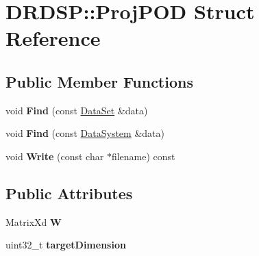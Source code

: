 \hypertarget{struct_d_r_d_s_p_1_1_proj_p_o_d}{\section{D\-R\-D\-S\-P\-:\-:Proj\-P\-O\-D Struct Reference}
\label{struct_d_r_d_s_p_1_1_proj_p_o_d}
}
\subsection*{Public Member Functions}
\begin{DoxyCompactItemize}
\item 
\hypertarget{struct_d_r_d_s_p_1_1_proj_p_o_d_ac9f95c6bc8a50ef1c714e32712449073}{void {\bfseries Find} (const \hyperlink{struct_d_r_d_s_p_1_1_data_set}{Data\-Set} \&data)}\label{struct_d_r_d_s_p_1_1_proj_p_o_d_ac9f95c6bc8a50ef1c714e32712449073}

\item 
\hypertarget{struct_d_r_d_s_p_1_1_proj_p_o_d_a47ceedabfdb2198401808fda62c4fe35}{void {\bfseries Find} (const \hyperlink{struct_d_r_d_s_p_1_1_data_system}{Data\-System} \&data)}\label{struct_d_r_d_s_p_1_1_proj_p_o_d_a47ceedabfdb2198401808fda62c4fe35}

\item 
\hypertarget{struct_d_r_d_s_p_1_1_proj_p_o_d_a78b437529229440941c60b44cee5144a}{void {\bfseries Write} (const char $\ast$filename) const }\label{struct_d_r_d_s_p_1_1_proj_p_o_d_a78b437529229440941c60b44cee5144a}

\end{DoxyCompactItemize}
\subsection*{Public Attributes}
\begin{DoxyCompactItemize}
\item 
\hypertarget{struct_d_r_d_s_p_1_1_proj_p_o_d_accfcb1fe9ae69a35a85d74732a04c9c7}{Matrix\-Xd {\bfseries W}}\label{struct_d_r_d_s_p_1_1_proj_p_o_d_accfcb1fe9ae69a35a85d74732a04c9c7}

\item 
\hypertarget{struct_d_r_d_s_p_1_1_proj_p_o_d_acdfe762ff68aa2be10d16797312a8215}{uint32\-\_\-t {\bfseries target\-Dimension}}\label{struct_d_r_d_s_p_1_1_proj_p_o_d_acdfe762ff68aa2be10d16797312a8215}

\end{DoxyCompactItemize}
